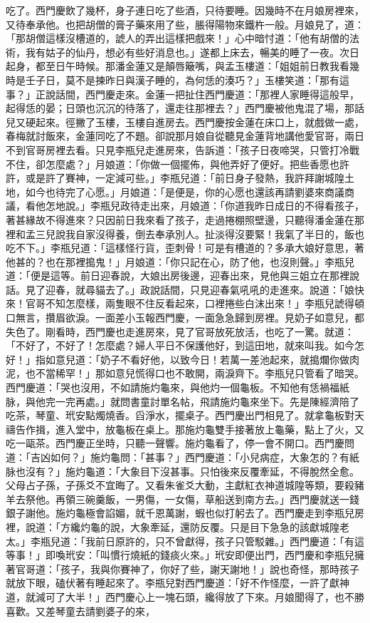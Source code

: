 \begin{showcontents}{}
吃了。西門慶飲了幾杯，身子連日吃了些酒，只待要睡。因幾時不在月娘房裡來，又待奉承他。也把胡僧的膏子藥來用了些，脹得陽物來鐵杵一般。月娘見了，道：「那胡僧這樣沒槽道的，諕人的弄出這樣把戲來！」心中暗忖道：「他有胡僧的法術，我有姑子的仙丹，想必有些好消息也。」遂都上床去，暢美的睡了一夜。次日起身，都至日午時候。那潘金蓮又是顛唇簸嘴，與孟玉樓道：「姐姐前日教我看幾時是壬子日，莫不是揀昨日與漢子睡的，為何恁的湊巧？」玉樓笑道：「那有這事？」正說話間，西門慶走來。金蓮一把扯住西門慶道：「那裡人家睡得這般早，起得恁的晏；日頭也沉沉的待落了，還走往那裡去？」西門慶被他鬼混了場，那話兒又硬起來。徑撇了玉樓，玉樓自進房去。西門慶按金蓮在床口上，就戲做一處，春梅就討飯來，金蓮同吃了不題。卻說那月娘自從聽見金蓮背地講他愛官哥，兩日不到官哥房裡去看。只見李瓶兒走進房來，告訴道：「孩子日夜啼哭，只管打冷戰不住，卻怎麼處？」月娘道：「你做一個擺佈，與他弄好了便好。把些香愿也許許，或是許了賽神，一定減可些。」李瓶兒道：「前日身子發熱，我許拜謝城隍土地，如今也待完了心愿。」月娘道：「是便是，你的心愿也還該再請劉婆來商議商議，看他怎地說。」李瓶兒政待走出來，月娘道：「你道我昨日成日的不得看孩子，著甚緣故不得進來？只因前日我來看了孩子，走過捲棚照壁邊，只聽得潘金蓮在那裡和孟三兒說我自家沒得養，倒去奉承別人。扯淡得沒要緊！我氣了半日的，飯也吃不下。」李瓶兒道：「這樣怪行貨，歪刺骨！可是有槽道的？多承大娘好意思，著他甚的？也在那裡搗鬼！」月娘道：「你只記在心，防了他，也沒則聲。」李瓶兒道：「便是這等。前日迎春說，大娘出房後邊，迎春出來，見他與三姐立在那裡說話。見了迎春，就尋貓去了。」政說話間，只見迎春氣吼吼的走進來。說道：「娘快來！官哥不知怎麼樣，兩隻眼不住反看起來，口裡捲些白沫出來！」李瓶兒諕得頓口無言，攢眉欲淚。一面差小玉報西門慶，一面急急歸到房裡。見奶子如意兒，都失色了。剛看時，西門慶也走進房來，見了官哥放死放活，也吃了一驚。就道：「不好了，不好了！怎麼處？婦人平日不保護他好，到這田地，就來叫我。如今怎好！」指如意兒道：「奶子不看好他，以致今日！若萬一差池起來，就搗爛你做肉泥，也不當稀罕！」那如意兒慌得口也不敢開，兩淚齊下。李瓶兒只管看了暗哭。西門慶道：「哭也沒用，不如請施灼龜來，與他灼一個龜板。不知他有恁禍福紙脉，與他完一完再處。」就問書童討單名帖，飛請施灼龜來坐下。先是陳經濟陪了吃茶，琴童、玳安點燭燒香。舀淨水，擺桌子。西門慶出門相見了。就拿龜板對天禱告作揖，進入堂中，放龜板在桌上。那施灼龜雙手接著放上龜藥，點上了火，又吃一甌茶。西門慶正坐時，只聽一聲響。施灼龜看了，停一會不開口。西門慶問道：「吉凶如何？」施灼龜問：「甚事？」西門慶道：「小兒病症，大象怎的？有紙脉也沒有？」施灼龜道：「大象目下沒甚事。只怕後來反覆牽延，不得脫然全愈。父母占子孫，子孫爻不宜晦了。又看朱雀爻大動，主獻紅衣神道城隍等類，要殺豬羊去祭他。再領三碗羹飯，一男傷，一女傷，草船送到南方去。」西門慶就送一錢銀子謝他。施灼龜極會諂媚，就千恩萬謝，蝦也似打躬去了。西門慶走到李瓶兒房裡，說道：「方纔灼龜的說，大象牽延，還防反覆。只是目下急急的該獻城隍老太。」李瓶兒道：「我前日原許的，只不曾獻得，孩子只管駁雜。」西門慶道：「有這等事！」即喚玳安：「叫慣行燒紙的錢痰火來。」玳安即便出門，西門慶和李瓶兒擁著官哥道：「孩子，我與你賽神了，你好了些，謝天謝地！」說也奇怪，那時孩子就放下眼，磕伏著有睡起來了。李瓶兒對西門慶道：「好不作怪麼，一許了獻神道，就減可了大半！」西門慶心上一塊石頭，纔得放了下來。月娘聞得了，也不勝喜歡。又差琴童去請劉婆子的來，
\end{showcontents}
